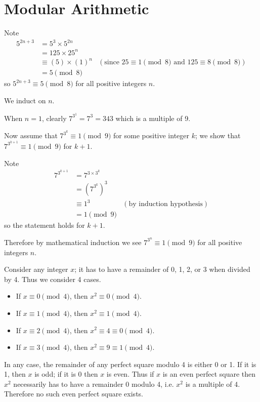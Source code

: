 \section{Modular Arithmetic}
\begin{questions}
    \item Note
    \begin{align*}
        5^{2n+3} &= 5^3 \times 5^{2n}\\
        &= 125 \times 25^n \\
        &\equiv (5) \times (1)^n & (\text{since } 25 \equiv 1 \pmod8 \text{ and } 125 \equiv 8 \pmod8)\\
        &= 5 \pmod8
    \end{align*}
    so $5^{2n+3} \equiv 5 \pmod8$ for all positive integers $n$.

    \item We induct on $n$.
    
    When $n = 1$, clearly $7^{3^1} = 7^3 = 343$ which is a multiple of 9.

    Now assume that $7^{3^k} \equiv 1 \pmod9$ for some positive integer $k$; we show that $7^{3^{k+1}} \equiv 1 \pmod9$ for $k + 1$.

    Note
    \begin{align*}
        7^{3^{k+1}} &= 7^{3\times3^k}\\
        &= \left(7^{3^k}\right)^3\\
        &\equiv 1^3 & (\text{by induction hypothesis})\\
        &= 1 \pmod9
    \end{align*}
    so the statement holds for $k+1$.

    Therefore by mathematical induction we see $7^{3^n} \equiv 1 \pmod9$ for all positive integers $n$.

    \item Consider any integer $x$; it has to have a remainder of 0, 1, 2, or 3 when divided by 4. Thus we consider 4 cases.
    \begin{itemize}
        \item If $x \equiv 0 \pmod4$, then $x^2 \equiv 0 \pmod4$.
        \item If $x \equiv 1 \pmod4$, then $x^2 \equiv 1 \pmod4$.
        \item If $x \equiv 2 \pmod4$, then $x^2 \equiv 4 \equiv 0 \pmod4$.
        \item If $x \equiv 3 \pmod4$, then $x^2 \equiv 9 \equiv 1 \pmod4$.
    \end{itemize}
    In any case, the remainder of any perfect square modulo 4 is either 0 or 1. If it is 1, then $x$ is odd; if it is 0 then $x$ is even. Thus if $x$ is an even perfect square then $x^2$ necessarily has to have a remainder 0 modulo 4, i.e. $x^2$ is a multiple of 4. Therefore no such even perfect square exists.


\end{questions}
